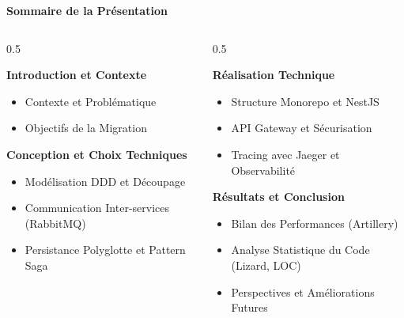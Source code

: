 \documentclass[10pt,aspectratio=169]{beamer}
\begin{document}
\begin{frame}{\textbf{Sommaire de la Présentation}}
    \begin{columns}
        \begin{column}{0.5\textwidth}
            \begin{block}{\textbf{Introduction et Contexte}}
                \begin{itemize}
                    \item Contexte et Problématique
                    \item Objectifs de la Migration
                \end{itemize}
            \end{block}
            \begin{block}{\textbf{Conception et Choix Techniques}}
                \begin{itemize}
                    \item Modélisation DDD et Découpage
                    \item Communication Inter-services (RabbitMQ)
                    \item Persistance Polyglotte et Pattern Saga
                \end{itemize}
            \end{block}
        \end{column}
        \begin{column}{0.5\textwidth}
            \begin{block}{\textbf{Réalisation Technique}}
                \begin{itemize}
                    \item Structure Monorepo et NestJS
                    \item API Gateway et Sécurisation
                    \item Tracing avec Jaeger et Observabilité
                \end{itemize}
            \end{block}
            \begin{block}{\textbf{Résultats et Conclusion}}
                \begin{itemize}
                    \item Bilan des Performances (Artillery)
                    \item Analyse Statistique du Code (Lizard, LOC)
                    \item Perspectives et Améliorations Futures
                \end{itemize}
            \end{block}
        \end{column}
    \end{columns}
\end{frame}
\end{document}
